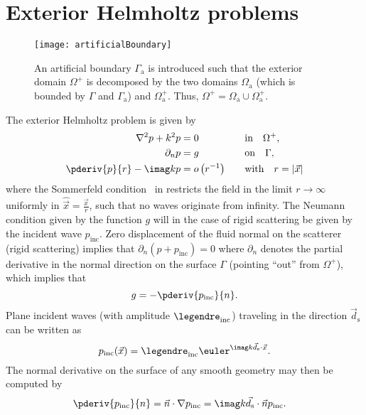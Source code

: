 \section{Exterior Helmholtz problems}
\begin{figure}
	\centering
	\texttt{[image: artificialBoundary]}
	\caption[Illustration of artificial boundary]{An artificial boundary $\Gamma_{\mathrm{a}}$ is introduced such that the exterior domain $\Omega^+$ is decomposed by the two domains $\Omega_{\mathrm{a}}$ (which is bounded by $\Gamma$ and $\Gamma_{\mathrm{a}}$) and $\Omega_{\mathrm{a}}^+$. Thus, $\Omega^+ = \Omega_{\mathrm{a}} \cup \Omega_{\mathrm{a}}^+$.}
	\label{Fig5:artificialBoundary}
\end{figure}
The exterior Helmholtz problem is given by
\begin{alignat}{3}
	\nabla^2 p + k^2 p &= 0 	&&\text{in}\quad \Omega^+,\label{Eq5:HelmholtzEqn}\\
	\partial_n p &= g						&&\text{on}\quad \Gamma,\label{Eq5:HelmholtzEqnNeumannCond}\\
	\pderiv{p}{r}-\imag k p &= o\left(r^{-1}\right)\quad &&\text{with}\quad r=|\vec{x}|\label{Eq5:sommerfeldCond}
\end{alignat}
where the Sommerfeld condition~\cite{Sommerfeld1949pde} in  restricts the field in the limit $r\to\infty$ uniformly in $\hat{\vec{x}}=\frac{\vec{x}}{r}$, such that no waves originate from infinity. The Neumann condition given by the function $g$ will in the case of rigid scattering be given by the incident wave $p_{\mathrm{inc}}$. Zero displacement of the fluid normal on the scatterer (rigid scattering) implies that $\partial_n(p+p_{\mathrm{inc}}) = 0$ where $\partial_n$ denotes the partial derivative in the normal direction on the surface $\Gamma$ (pointing ``out'' from $\Omega^+$), which implies that
\begin{equation}
	g = -\pderiv{p_{\mathrm{inc}}}{n}.
\end{equation}
Plane incident waves (with amplitude $\legendre_{\mathrm{inc}}$) traveling in the direction $\vec{d}_{\mathrm{s}}$ can be written as
\begin{equation}\label{Eq5:p_inc}
	p_{\mathrm{inc}}(\vec{x}) = \legendre_{\mathrm{inc}}\euler^{\imag k\vec{d}_{\mathrm{s}}\cdot\vec{x}}.
\end{equation}
The normal derivative on the surface of any smooth geometry may then be computed by
\begin{align}
	\pderiv{p_{\mathrm{inc}}}{n} &= \vec{n}\cdot\nabla p_{\mathrm{inc}} = \imag k\vec{d}_{\mathrm{s}}\cdot\vec{n} p_{\mathrm{inc}}.
\end{align}

